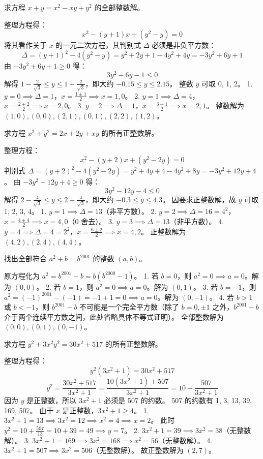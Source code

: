 \begin{questions}
\question 求方程 $x + y = x^2 - xy + y^2$ 的全部整数解。
\begin{solution}
整理方程得：
\[x^2 - (y + 1)x + (y^2 - y) = 0\]
将其看作关于 $x$ 的一元二次方程，其判别式 $\Delta$ 必须是非负平方数：
\[\Delta = (y + 1)^2 - 4(y^2 - y) = y^2 + 2y + 1 - 4y^2 + 4y = -3y^2 + 6y + 1\]
由 $-3y^2 + 6y + 1 \ge 0$ 得：
\[3y^2 - 6y - 1 \le 0\]
解得 $1 - \frac{2}{\sqrt{3}} \le y \le 1 + \frac{2}{\sqrt{3}}$，即大约 $-0.15 \le y \le 2.15$。
整数 $y$ 可取 0, 1, 2。
1. $y = 0 \implies \Delta = 1$，$x = \frac{1 \pm 1}{2} \implies x = 1, 0$。
2. $y = 1 \implies \Delta = 4$，$x = \frac{2 \pm 2}{2} \implies x = 2, 0$。
3. $y = 2 \implies \Delta = 1$，$x = \frac{3 \pm 1}{2} \implies x = 2, 1$。
整数解为 $(1, 0), (0, 0), (2, 1), (0, 1), (2, 2), (1, 2)$。
\end{solution}

\question 求方程 $x^2 + y^2 = 2x + 2y + xy$ 的所有正整数解。
\begin{solution}
整理方程：
\[x^2 - (y + 2)x + (y^2 - 2y) = 0\]
判别式 $\Delta = (y + 2)^2 - 4(y^2 - 2y) = y^2 + 4y + 4 - 4y^2 + 8y = -3y^2 + 12y + 4$。
由 $-3y^2 + 12y + 4 \ge 0$ 得：
\[3y^2 - 12y - 4 \le 0\]
解得 $2 - \frac{4}{\sqrt{3}} \le y \le 2 + \frac{4}{\sqrt{3}}$，即大约 $-0.3 \le y \le 4.3$。
因要求正整数解，故 $y$ 可取 1, 2, 3, 4。
1. $y = 1 \implies \Delta = 13$（非平方数）。
2. $y = 2 \implies \Delta = 16 = 4^2$，$x = \frac{4 \pm 4}{2} \implies x = 4, 0$（0 舍去）。
3. $y = 3 \implies \Delta = 13$（非平方数）。
4. $y = 4 \implies \Delta = 4 = 2^2$，$x = \frac{6 \pm 2}{2} \implies x = 4, 2$。
正整数解为 $(4, 2), (2, 4), (4, 4)$。
\end{solution}

\question 找出全部符合 $a^2 + b = b^{2001}$ 的整数 $(a, b)$。
\begin{solution}
原方程化为 $a^2 = b^{2001} - b = b(b^{2000} - 1)$。
1. 若 $b = 0$，则 $a^2 = 0 \implies a = 0$。解为 $(0, 0)$。
2. 若 $b = 1$，则 $a^2 = 0 \implies a = 0$。解为 $(0, 1)$。
3. 若 $b = -1$，则 $a^2 = (-1)^{2001} - (-1) = -1 + 1 = 0 \implies a = 0$。解为 $(0, -1)$。
4. 若 $b > 1$ 或 $b < -1$，则 $b^{2001} - b$ 不可能是一个完全平方数（除了 $b=0, \pm 1$ 之外，$b^{2001}-b$ 介于两个连续平方数之间，此处省略具体不等式证明）。
全部整数解为 $(0, 0), (0, 1), (0, -1)$。
\end{solution}

\question 求方程 $y^2 + 3x^2y^2 = 30x^2 + 517$ 的所有正整数解。
\begin{solution}
整理方程得：
\[y^2(3x^2 + 1) = 30x^2 + 517\]
\[y^2 = \frac{30x^2 + 517}{3x^2 + 1} = \frac{10(3x^2 + 1) + 507}{3x^2 + 1} = 10 + \frac{507}{3x^2 + 1}\]
因为 $y$ 是正整数，所以 $3x^2 + 1$ 必须是 507 的约数。
507 的约数有 1, 3, 13, 39, 169, 507。
由于 $x$ 是正整数，$3x^2 + 1 \ge 4$。
1. $3x^2 + 1 = 13 \implies 3x^2 = 12 \implies x^2 = 4 \implies x = 2$。
   此时 $y^2 = 10 + \frac{507}{13} = 10 + 39 = 49 \implies y = 7$。
2. $3x^2 + 1 = 39 \implies 3x^2 = 38$（无整数解）。
3. $3x^2 + 1 = 169 \implies 3x^2 = 168 \implies x^2 = 56$（无整数解）。
4. $3x^2 + 1 = 507 \implies 3x^2 = 506$（无整数解）。
故正整数解为 $(2, 7)$。
\end{solution}


\end{questions}
